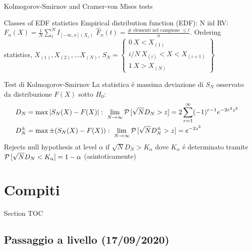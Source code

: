 \documentclass[asd-beamer.tex]{subfiles}
\begin{document}
\begin{frame}{Kolmogorov-Smirnov and Cramer-von Mises tests}
\begin{block}{Classes of EDF statistics}
	Empirical distribution function (EDF): N iid RV: $F_n(X)=\frac{1}{N}\sum_i^NI_{[-\infty,x](X_i)}$ $\hat{F}_n(t)=\frac{\#\text{ elementi nel campione }\leq t}{n}$.
 Ordering statistics, $X_{(1)}, X_{(2)}, \ldots X_{(N)}$, $S_N=\left\{\begin{array}{c}0\ X<X_{(1)}\\i/N\ X_{(i)}<X<X_{(i+1)}\\1\ X>X_{(N)}\end{array}\right\}$
\end{block}

\begin{block}{Test di Kolmogorov-Smirnov }
La statistica \'e massima deviazione di $S_N$ osservato da distribuzione $F(X)$ sotto $H_0$:
\begin{align*}
&D_N=\max|S_N(X)-F(X)|:\ \lim_{N\to\infty}\prob{[\sqrt{N}D_N>z]}=2\sum_{r=1}^{\infty}(-1)\expy{r-1}\exp{-2r^2z^2}\\
&D_N^{\pm}=\max\pm(S_N(X)-F(X)):\ \lim_{N\to\infty}\prob{[\sqrt{N}D_N^{\pm}>z]}=\exp{-2z^2}
\end{align*}
Rejects null hypothesis at level $\alpha$ if $\sqrt{N}D_N>K_{\alpha}$ dove $K_{\alpha}$ \'e determinato tramite $\operatorname{\mathcal{P}}{[\sqrt{N}D_N<K_{\alpha}]}=1-\alpha$ (asintoticamente)
\end{block}
\end{frame}


\section{Compiti}

\begin{frame}[allowframebreaks]{Section TOC}
\tableofcontents[currentsection,sectionstyle=show/hide,subsectionstyle=show/show/hide]
\end{frame}

\subsection{Passaggio a livello (17/09/2020)}
\end{document}
